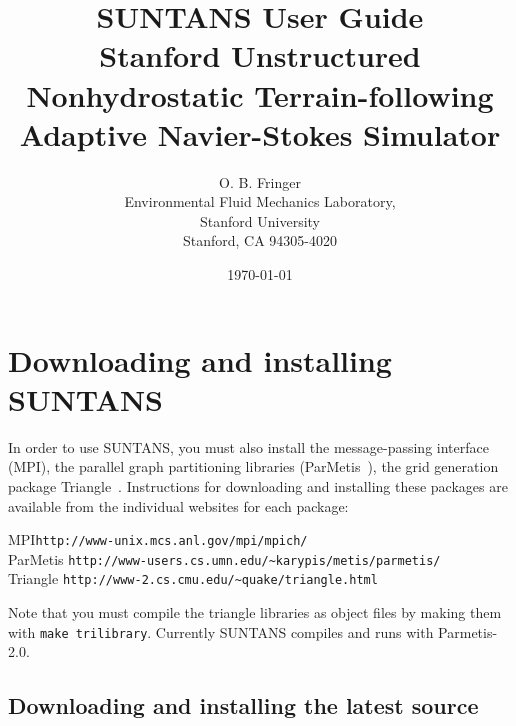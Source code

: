 \documentclass[12pt,oneside]{article}
\begin{document}

\title{SUNTANS User Guide\\
{\large Stanford Unstructured Nonhydrostatic 
Terrain-following Adaptive Navier-Stokes Simulator}}
\author{O. B. Fringer\\
\small
Environmental Fluid Mechanics Laboratory,  \\
Stanford University\\
Stanford, CA 94305-4020
\normalsize}
\date{\today}

\maketitle

\tableofcontents

\section{Downloading and installing SUNTANS}

In order to use SUNTANS, you must also install the message-passing
interface (MPI), the parallel graph partitioning libraries (ParMetis~\cite{PARMETIS[1998]}),
the grid generation package Triangle~\cite{TRIANGLE[1996]}.  Instructions for 
downloading and installing these packages are available from the individual websites
for each package:
\begin{tabbing}
MPI\hspace{0.5in}\=  \verb+http://www-unix.mcs.anl.gov/mpi/mpich/+\\
ParMetis \> \verb+http://www-users.cs.umn.edu/~karypis/metis/parmetis/+\\
Triangle \> \verb+http://www-2.cs.cmu.edu/~quake/triangle.html+
\end{tabbing}
Note that you must compile the triangle libraries as object files by making them
with \verb+make trilibrary+.  Currently SUNTANS compiles and runs with Parmetis-2.0.

\subsection{Downloading and installing the latest source}
\end{document}
